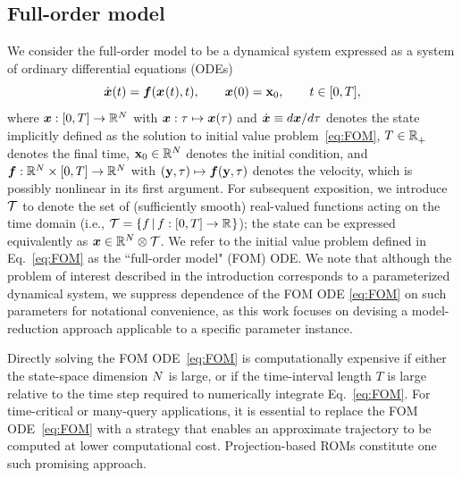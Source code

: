 \documentclass[3p,computermodern,10pt]{elsarticle}
\begin{document}
	\subsection{Full-order model}\label{sec;FOM}
We consider the full-order model to be a dynamical system expressed as a
	system of ordinary differential equations (ODEs)
\begin{equation}\label{eq:FOM}
 \dot{{\boldsymbol x}}(t)  = \boldsymbol f({\boldsymbol x}^{}(t),t), \qquad {\boldsymbol x}(0) =
	{{\mathbf{x}}_0},\qquad t \in [0,T],
\end{equation}
where  ${\boldsymbol x}: [0,T]
	\rightarrow  \mathbb{R}^{N}$ with ${\boldsymbol x}: \tau \mapsto
	{\boldsymbol x}(\tau) $ and $\dot{{\boldsymbol x}} \equiv {d {\boldsymbol x}}/{d\tau}$
	denotes the state implicitly defined as the solution to initial value
	problem~\eqref{eq:FOM}, 
$T \in \mathbb{R}^{}_{+}$ denotes the final time, 
 ${{\mathbf{x}}_0} \in \mathbb{R}^{N}$ denotes the initial condition,
	and $\boldsymbol f: \mathbb{R}^{N} \times [0,T] \rightarrow
	\mathbb{R}^{N}$ with $(\mathbf{y},\tau) \mapsto
	\boldsymbol f(\mathbf{y},\tau)$ denotes the velocity, which is possibly
	nonlinear in its first argument. For subsequent exposition, we introduce
	$\mathcal{T}$ to denote the set of (sufficiently smooth) real-valued functions acting on the time
	domain (i.e., $\mathcal{T} = \{f\,|\,f:[0,T]\rightarrow\mathbb{R}^{}\}$); the
	state can be expressed equivalently as ${\boldsymbol x} \in \mathbb{R}^{N} \otimes
	\mathcal{T} $.  We refer to the initial value problem defined in
	Eq.~\eqref{eq:FOM} as the ``full-order model" (FOM) ODE. We note that
	although the problem of interest described in the introduction corresponds
	to a parameterized dynamical system, we suppress dependence of the FOM ODE
	\eqref{eq:FOM} on such parameters for notational convenience, as this work
	focuses on devising a model-reduction approach applicable to a specific parameter instance.

Directly solving the FOM ODE~\eqref{eq:FOM} is computationally expensive if
	either the state-space dimension $N$ is large, or if the time-interval
	length $T$ is large relative to the time step required to numerically
	integrate Eq.~\eqref{eq:FOM}. For time-critical or many-query applications,
	it is essential to replace the FOM ODE~\eqref{eq:FOM} with a strategy that
	enables an approximate trajectory to be computed at lower computational
	cost. Projection-based ROMs constitute one such promising approach. 
\end{document}
